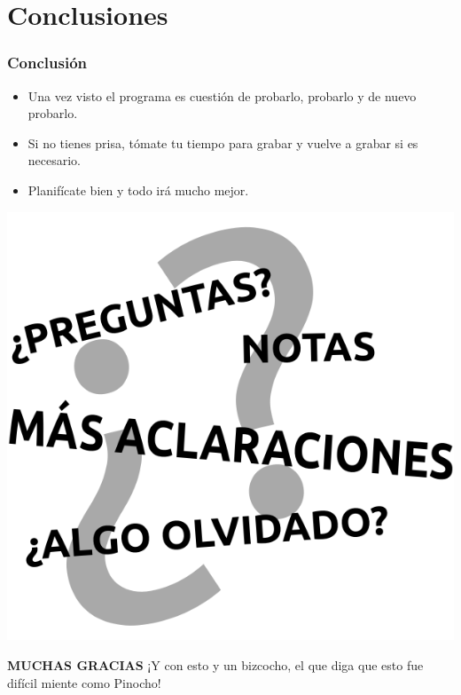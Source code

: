 \documentclass{beamer}
\begin{document}
	\section{Conclusiones}
		\begin{frame}
			\frametitle{Conclusión}
			\justifying 
			\begin{itemize}
				\item Una vez visto el programa es cuestión de probarlo, probarlo y de nuevo probarlo.
				\item Si no tienes prisa, tómate tu tiempo para grabar y vuelve a grabar si es necesario.
				\item Planifícate bien y todo irá mucho mejor.
			\end{itemize}
		\end{frame}
		\begin{frame}
			\begin{center}
				\includegraphics[height=\textheight, keepaspectratio=true]{Imagenes/PreguntasDudasAclaraciones.png}
			\end{center}
		\end{frame}
		\begin{frame}
			\begin{center}
				\Huge{\textbf{MUCHAS GRACIAS}}
				¡Y con esto y un bizcocho, el que diga que esto fue difícil miente como Pinocho!
			\end{center}
		\end{frame}
\end{document}
